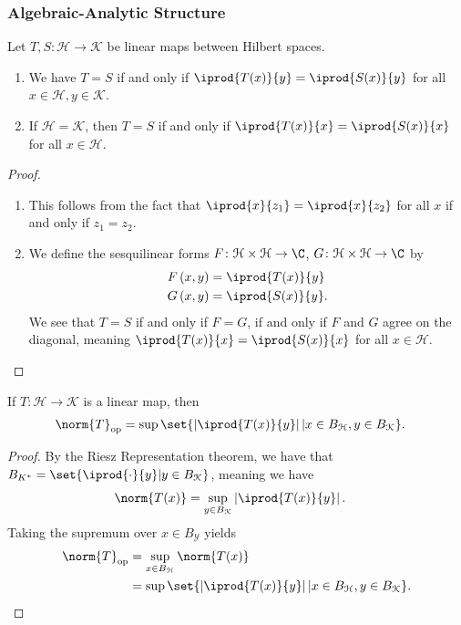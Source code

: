 \documentclass[10pt]{mypackage}
\begin{document}
\subsubsection{Algebraic-Analytic Structure}%
\begin{fact}
  Let $T,S\colon \mathcal{H}\rightarrow \mathcal{K}$ be linear maps between Hilbert spaces.
  \begin{enumerate}[(1)]
    \item We have $T=S$ if and only if $ \iprod{T(x)}{y} = \iprod{S(x)}{y} $ for all $x\in \mathcal{H}, y\in \mathcal{K}$.
    \item If $\mathcal{H} = \mathcal{K}$, then $T = S$ if and only if $ \iprod{T(x)}{x} = \iprod{S(x)}{x} $ for all $x\in \mathcal{H}$.
  \end{enumerate}
\end{fact}
\begin{proof}\hfill
  \begin{enumerate}[(1)]
    \item This follows from the fact that $ \iprod{x}{z_1} = \iprod{x}{z_2} $ for all $x$ if and only if $z_1 = z_2$.
    \item We define the sesquilinear forms $F\colon \mathcal{H}\times \mathcal{H}\rightarrow \C$, $G\colon \mathcal{H}\times \mathcal{H}\rightarrow \C$ by
      \begin{align*}
        F\left(x,y\right) &= \iprod{T(x)}{y}\\
        G\left(x,y\right) &= \iprod{S(x)}{y}.
      \end{align*}
      We see that $T = S$ if and only if $F = G$, if and only if $F$ and $G$ agree on the diagonal, meaning $ \iprod{T(x)}{x} = \iprod{S(x)}{x} $ for all $x\in \mathcal{H}$.
  \end{enumerate}
\end{proof}
\begin{fact}
  If $T\colon \mathcal{H}\rightarrow \mathcal{K}$ is a linear map, then
  \begin{align*}
    \norm{T}_{\text{op}} &= \sup\set{\left\vert \iprod{T(x)}{y} \right\vert | x\in B_{\mathcal{H}},y\in B_{\mathcal{K}}}.
  \end{align*}
\end{fact}
\begin{proof}
  By the Riesz Representation theorem, we have that $B_{K^{\ast}} = \set{ \iprod{\cdot}{y} | y\in B_{\mathcal{K}} }$, meaning we have
  \begin{align*}
    \norm{T(x)} &= \sup_{y\in B_{\mathcal{K}}}\left\vert \iprod{T(x)}{y} \right\vert.
  \end{align*}
  Taking the supremum over $x\in B_{\mathcal{Y}}$ yields
  \begin{align*}
    \norm{T}_{\text{op}} &= \sup_{x\in B_{\mathcal{H}}} \norm{T(x)}\\
                         &= \sup\set{ \left\vert \iprod{T(x)}{y} \right\vert | x\in B_{\mathcal{H}},y\in B_{\mathcal{K}} }.
  \end{align*}
\end{proof}
\end{document}
